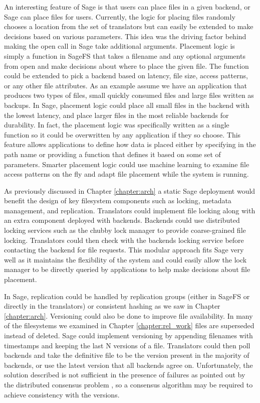An interesting feature of Sage is that users can place files in a given
backend, or Sage can place files for users. Currently, the logic for placing
files randomly chooses a location from the set of translators but can easily
be extended to make decisions based on various parameters. This idea was the
driving factor behind making the open call in Sage take additional arguments.
Placement logic is simply a function in SageFS that takes a filename and any
optional arguments from open and make decisions about where to place the given
file. The function could be extended to pick a backend based on latency, file
size, access patterns, or any other file attributes. As an example assume we
have an application that produces two types of files, small quickly consumed
files and large files written as backups. In Sage, placement logic could place
all small files in the backend with the lowest latency, and place larger files
in the most reliable backends for durability. In fact, the placement logic was
specifically written as a single function so it could be overwritten by any
application if they so choose. This feature allows  applications to define how
data is placed either by specifying in the path name or providing a function
that defines it based on some set of parameters. Smarter placement logic could
use machine learning to examine file access patterns on the fly and adapt file
placement while the system is running.

As previously discussed in Chapter \ref{chapter:arch} a static Sage deployment
would benefit the design of key filesystem components such as locking,
metadata management, and replication. Translators could implement file locking
along with an extra component deployed with backends. Backends could use
distributed locking services such as the chubby lock manager
\cite{Burrows2006} to provide coarse-grained file locking. Translators could
then check with the backends locking service before contacting the backend for
file requests. This modular approach fits Sage very well as it maintains the
flexibility of the system and could easily allow the lock manager to be
directly queried by applications to help make decisions about file placement.

In Sage, replication could be handled by replication groups (either in SageFS
or directly in the translators) or consistent hashing as we saw in Chapter
\ref{chapter:arch}. Versioning could also be done to improve file
availability. In many of the filesystems we examined in Chapter
\ref{chapter:rel_work} files are superseded instead of deleted. Sage could
implement versioning by appending filenames with timestamps and keeping the
last N versions of a file. Translators could then poll backends and take the
definitive file to be the version present in the majority of backends, or use
the latest version that all backends agree on. Unfortunately, the solution
described is not sufficient in the presence of failures as pointed out by the
distributed consensus problem \cite{Lamport1983,Lamport1980}, so a consensus
algorithm may be required to achieve consistency with the versions.

